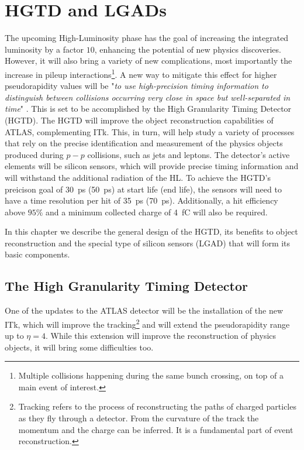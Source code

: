\chapter{HGTD and LGADs}\label{chap:HGTD_LGADs}

The upcoming High-Luminosity phase has the goal of increasing the integrated luminosity by a factor \(10\), enhancing the potential of new physics discoveries. However, it will also bring a variety of new complications, most importantly the increase in pileup interactions\footnote{Multiple collisions happening during the same bunch crossing, on top of a main event of interest.}.
A new way to mitigate this effect for higher pseudorapidity values will be "\textit{to use high-precision timing information to distinguish between collisions occurring very close in space but well-separated in time}" \cite{CERN-LHCC-2020-007}. This is set to be accomplished by the High Granularity Timing Detector (HGTD).
The HGTD will improve the object reconstruction capabilities of ATLAS, complementing ITk. This, in turn, will help study a variety of processes that rely on the precise identification and measurement of the physics objects produced during \(p-p\) collisions, such as jets and leptons.
The detector's active elements will be silicon sensors, which will provide precise timing information and will withstand the additional radiation of the HL. To achieve the HGTD's preicison goal of \qty{30}{\pico\second} (\qty{50}{\pico\second}) at start life (end life), the sensors will need to have a time resolution per hit of \qty{35}{\pico\second} (\qty{70}{\pico\second}). Additionally, a hit efficiency above \(95\%\) and %
a minimum collected charge of \qty{4}{\femto\coulomb} will also be required.

In this chapter we describe the general design of the HGTD, its benefits to object reconstruction and the special type of silicon sensors (LGAD) that will form its basic components.

\section{The High Granularity Timing Detector}\label{sec:HGTD}
One of the updates to the ATLAS detector will be the installation of the new ITk, which will improve the tracking\footnote{Tracking refers to the process of reconstructing the paths of charged particles as they fly through a detector. From the curvature of the track the momentum and the charge can be inferred. It is a fundamental part of event reconstruction.} and will extend the pseudorapidity range up to \(\eta=4\). While this extension will improve the reconstruction of physics objects, it will bring some difficulties too.

